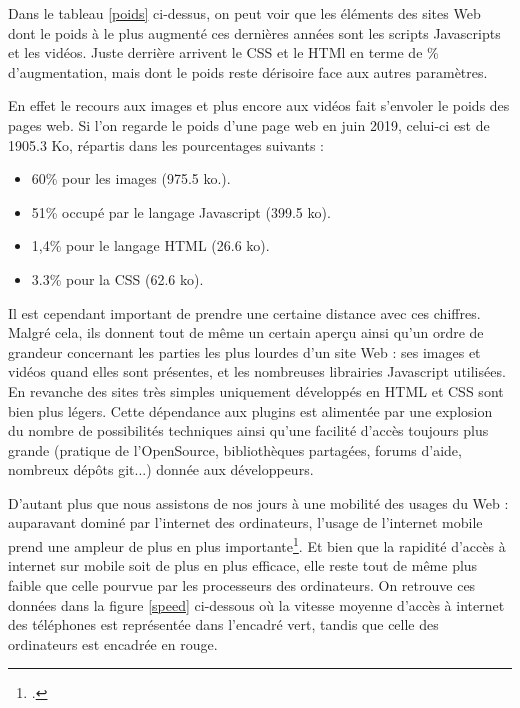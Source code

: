 \documentclass[a4paper,12pt,twoside]{book}
\begin{document}
Dans le tableau \ref{poids} ci-dessus, on peut voir que les éléments des sites Web dont le poids à le plus augmenté ces dernières années sont les scripts Javascripts et les vidéos. Juste derrière arrivent le CSS et le HTMl en terme de \% d'augmentation, mais dont le poids reste dérisoire face aux autres paramètres.

En effet le recours aux images et plus encore aux vidéos fait s'envoler le poids des pages web. Si l'on regarde le poids d'une page web en juin 2019, celui-ci est de 1905.3 Ko, répartis dans les pourcentages suivants :
\begin{itemize}
    \item 60\% pour les images (975.5 ko.).
    \item 51\% occupé par le langage Javascript (399.5 ko).
    \item 1,4\% pour le langage \acrshort{HTML} (26.6 ko).
    \item 3.3\% pour la \acrshort{CSS} (62.6 ko).
\end{itemize}

Il est cependant important de prendre une certaine distance avec ces chiffres. Malgré cela, ils donnent tout de même un certain aperçu ainsi qu'un ordre de grandeur concernant les parties les plus lourdes d'un site Web : ses images et vidéos quand elles sont présentes, et les nombreuses librairies Javascript utilisées. En revanche des sites très simples uniquement développés en \acrshort{HTML} et \acrshort{CSS} sont bien plus légers. Cette dépendance aux plugins est alimentée par une explosion du nombre de possibilités techniques ainsi qu'une facilité d'accès toujours plus grande (pratique de l'OpenSource, bibliothèques partagées, forums d'aide, nombreux dépôts git...) donnée aux développeurs.

D'autant plus que nous assistons de nos jours à une mobilité des usages du Web : auparavant dominé par l'internet des ordinateurs, l'usage de l'internet mobile prend une ampleur de plus en plus importante\footcite{digital}. Et bien que la rapidité d'accès à internet sur mobile soit de plus en plus efficace, elle reste tout de même plus faible que celle pourvue par les processeurs des ordinateurs. On retrouve ces données dans la figure \ref{speed} ci-dessous où la vitesse moyenne d'accès à internet des téléphones est représentée dans l'encadré vert, tandis que celle des ordinateurs est encadrée en rouge.
\end{document}

